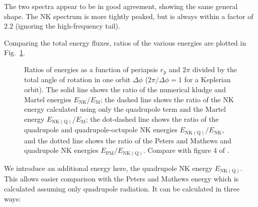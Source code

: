 \documentclass[useAMS,usedcolumn,usegraphicx,usenatbib]{mn2e}
\newcommand{\figref}[1]{Fig.~\ref{fig:#1}}
\newcommand{\sub}[1]{\ensuremath{_\mathrm{#1}}}
\begin{document}
The two spectra appear to be in good agreement, showing the same general shape. The NK spectrum is more tightly peaked, but is always within a factor of $2.2$ (ignoring the high-frequency tail).

Comparing the total energy fluxes, ratios of the various energies are plotted in \figref{Energy_ratio}.
\begin{figure}
  \begin{center}
    \quad
    \caption{Ratios of energies as a function of periapsis $r\sub{p}$ and $2\pi$ divided by the total angle of rotation in one orbit $\Delta\phi$ ($2\pi/\Delta\phi = 1$ for a Keplerian orbit). The solid line shows the ratio of the numerical kludge and Martel energies $E\sub{NK}/E\sub{M}$; the dashed line shows the ratio of the NK energy calculated using only the quadrupole term and the Martel energy $E\sub{NK(Q)}/E\sub{M}$; the dot-dashed line shows the ratio of the quadrupole and quadrupole-octupole NK energies $E\sub{NK(Q)}/E\sub{NK}$, and the dotted line shows the ratio of the Peters and Mathews and quadrupole NK energies $E\sub{PM}/E\sub{NK(Q)}$. Compare with figure 4 of \citet{Gair2005}.}
    \label{fig:Energy_ratio}
  \end{center}
\end{figure}
We introduce an additional energy here, the quadrupole NK energy $E\sub{NK(Q)}$. This allows easier comparison with the Peters and Mathews energy which is calculated assuming only quadrupole radiation. It can be calculated in three ways:
\end{document}
